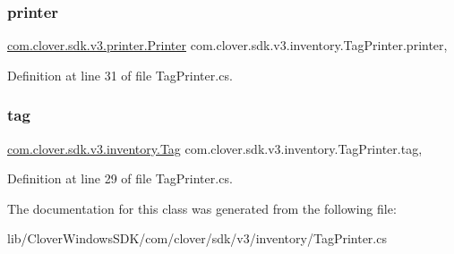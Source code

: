 \subsubsection{\texorpdfstring{printer}{printer}}
{\footnotesize\ttfamily \hyperlink{classcom_1_1clover_1_1sdk_1_1v3_1_1printer_1_1_printer}{com.\+clover.\+sdk.\+v3.\+printer.\+Printer} com.\+clover.\+sdk.\+v3.\+inventory.\+Tag\+Printer.\+printer\hspace{0.3cm}{\ttfamily [get]}, {\ttfamily [set]}}



Definition at line 31 of file Tag\+Printer.\+cs.

\mbox{\label{classcom_1_1clover_1_1sdk_1_1v3_1_1inventory_1_1_tag_printer_a3c80d9bcbf1b3a00b273b5567561397f}} 
\subsubsection{\texorpdfstring{tag}{tag}}
{\footnotesize\ttfamily \hyperlink{classcom_1_1clover_1_1sdk_1_1v3_1_1inventory_1_1_tag}{com.\+clover.\+sdk.\+v3.\+inventory.\+Tag} com.\+clover.\+sdk.\+v3.\+inventory.\+Tag\+Printer.\+tag\hspace{0.3cm}{\ttfamily [get]}, {\ttfamily [set]}}



Definition at line 29 of file Tag\+Printer.\+cs.



The documentation for this class was generated from the following file\+:\begin{DoxyCompactItemize}
\item 
lib/\+Clover\+Windows\+S\+D\+K/com/clover/sdk/v3/inventory/Tag\+Printer.\+cs\end{DoxyCompactItemize}
